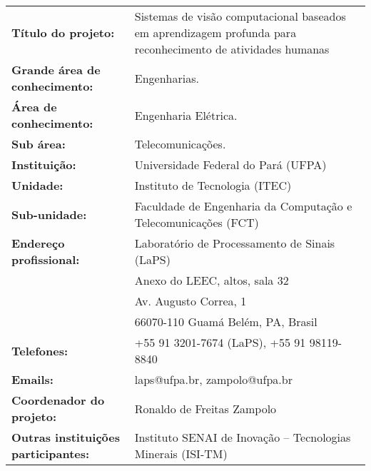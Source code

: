 \begin{table}[!th]
\begin{tabular}{l p{}}
\textbf{Título do projeto:}           & Sistemas de visão computacional baseados em aprendizagem profunda para reconhecimento de atividades humanas\\
\textbf{Grande área de conhecimento:} & Engenharias.\\
\textbf{Área de conhecimento:}        & Engenharia Elétrica.\\
\textbf{Sub área:}                    & Telecomunicações.\\
\textbf{Instituição:}                 & Universidade Federal do Pará (UFPA)\\
\textbf{Unidade:}                     & Instituto de Tecnologia (ITEC)\\
\textbf{Sub-unidade:}                 & Faculdade de Engenharia da Computação e Telecomunicações (FCT)\\
\textbf{Endereço profissional:}       & Laboratório de Processamento de Sinais (LaPS)\\
                                     & Anexo do LEEC, altos, sala 32\\
                                     & Av. Augusto Correa, 1\\
                                     & 66070-110 Guamá Belém, PA, Brasil\\
\textbf{Telefones:}                    & +55 91 3201-7674 (LaPS), +55 91 98119-8840\\
\textbf{Emails:}                      & laps@ufpa.br, zampolo@ufpa.br\\
\textbf{Coordenador do projeto:}      & Ronaldo de Freitas Zampolo \\
\textbf{Outras instituições participantes:} & Instituto SENAI de Inovação -- Tecnologias Minerais (ISI-TM) \\

\end{tabular}
\end{table}
